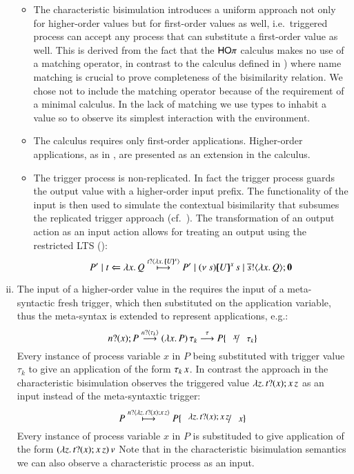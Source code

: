 \begin{enumerate}[i)]
\begin{itemize}
			\item	The characteristic bisimulation introduces a uniform approach
				not only for
				higher-order values but for first-order values
				as well, i.e.~triggered process can accept any
				process that can substitute a first-order value as well.
				This is derived from the fact that the $\mathsf{HO}\pi$
				calculus makes no use of a matching operator, in contrast
				to the calculus defined in \cite{DBLP:journals/lmcs/JeffreyR05})
				where name matching is crucial to prove completeness
				of the bisimilarity relation.
				We chose not to include the matching operator
				because of the requirement of a minimal calculus.
				In the lack of matching we use types to inhabit
				a value so to observe its simplest interaction
				with the environment.

			\item	The \HOp calculus requires only first-order
				applications. Higher-order applications,
				as in \cite{DBLP:journals/lmcs/JeffreyR05},
				are presented as an extension in the \HOpp
				calculus.

			\item	The trigger process is non-replicated. In fact
				the trigger process guards the output
				value with a higher-order input prefix. The
				functionality of the input is then used to
				simulate the contextual bisimilarity that subsumes
				the replicated trigger approach (cf.~).
				The transformation of an output action as an input
				action allows for treating an output
				using the restricted LTS ():
				\[
					P' \Par \htrigger{t}{\abs{x}{Q}} \hby{\bactinp{t}{\abs{x}{\mapchar{U}{x}}}}
					P' \Par \news{s}{ \appl{\mapchar{U}{x}}{s} \Par \bout{\dual{s}}{\abs{x}{Q}} \inact}
				\]
		\end{itemize}

	\item	The input of a higher-order value in the \cite{DBLP:journals/lmcs/JeffreyR05}
		requires 
		the input of a meta-syntactic fresh trigger, which then
		substituted on the application variable, thus the meta-syntax
		is extended to represent applications, e.g.:
		\[
			\binp{n}{x} P \by{\bactinp{n}{\tau_k}} \appl{(\abs{x}{P})}{\tau_k} \by{\tau} P \subst{x}{\tau_k} 
		\]
		Every instance of process variable $x$ in $P$ being substituted
		with trigger value $\tau_k$ to give an application of the form $\tau_k\,x$.
		In contrast the approach in the characteristic bisimulation observes the
		triggered value
		$\lambda z.\,t ? (x) ; x\,z$ as an input instead of the
		meta-syntaxtic trigger:
		\[
			P \hby{\bactinp{n}{\abs{z}\binp{t}{x} \appl{x}{z}}} P \subst{\abs{z}\binp{t}{x} \appl{x}{z}}{x}
		\]
		Every instance of process variable $x$ in $P$
		is substituded to give application of the form
		$(\lambda z.\,t ? (x) ; x\,z)\,v$
		Note that in the characteristic bisimulation semantics
		we can also observe a characteristic process as an input.
		

\end{enumerate}

